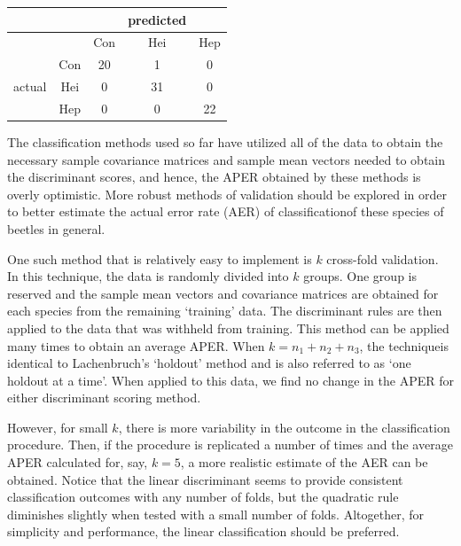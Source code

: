 \begin{enumerate}
\begin{center}
\begin{tabular}{| c | c | c c c |}
	\hline
	&& & predicted & \\
	\hline
	&& Con & Hei & Hep \\
	\hline
	& Con& 20 & 1 & 0 \\
	actual & Hei & 0 & 31 & 0 \\
	& Hep & 0 & 0 & 22 \\
	\hline
\end{tabular}
\end{center}

	The classification methods used so far have utilized all of the data to obtain the necessary sample covariance matrices and sample mean vectors needed to obtain the discriminant scores, and hence, the APER obtained by these methods is overly optimistic. More robust methods of validation should be explored in order to better estimate the actual error rate (AER) of classificationof these species of beetles in general. 

	One such method that is relatively easy to implement is $k$ cross-fold validation. In this technique, the data is randomly divided into $k$ groups. One group is reserved and the sample mean vectors and covariance matrices are obtained for each species from the remaining `training' data. The discriminant rules are then applied to the data that was withheld from training. This method can be applied many times to obtain an average APER. When $k=n_1+n_2+n_3$, the techniqueis identical to Lachenbruch's `holdout' method and is also referred to as `one holdout at a time'. When applied to this data, we find no change in the APER for either discriminant scoring method.

	However, for small $k$, there is more variability in the outcome in the classification procedure. Then, if the procedure is replicated a number of times and the average APER calculated for, say, $k=5$, a more realistic estimate of the AER can be obtained. Notice that the linear discriminant seems to provide consistent classification outcomes with any number of folds, but the quadratic rule diminishes slightly when tested with a small number of folds. Altogether, for simplicity and performance, the linear classification should be preferred.


\end{enumerate}
